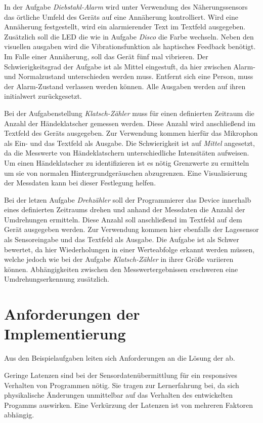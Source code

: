 \documentclass[11pt,a4paper]{report}
\begin{document}
In der Aufgabe \textit{Diebstahl-Alarm} wird unter Verwendung des Näherungssensors das örtliche Umfeld des Geräts auf eine Annäherung kontrolliert.
Wird eine Annäherung festgestellt, wird ein alarmierender Text im Textfeld ausgegeben.
Zusätzlich soll die LED die wie in Aufgabe \textit{Disco} die Farbe wechseln.
Neben den visuellen ausgaben wird die Vibrationsfunktion als haptisches Feedback benötigt.
Im Falle einer Annäherung, soll das Gerät fünf mal vibrieren.
Der Schwierigkeitsgrad der Aufgabe ist als Mittel eingestuft, da hier zwischen Alarm- und Normalzustand unterschieden werden muss.
Entfernt sich eine Person, muss der Alarm-Zustand verlassen werden können.
Alle Ausgaben werden auf ihren initialwert zurückgesetzt.

Bei der Aufgabenstellung \textit{Klatsch-Zähler} muss für einen definierten Zeitraum die Anzahl der Händeklatscher gemessen werden.
Diese Anzahl wird anschließend im Textfeld des Geräts ausgegeben.
Zur Verwendung kommen hierfür das Mikrophon als Ein- und das Textfeld als Ausgabe.
Die Schwierigkeit ist auf \textit{Mittel} angesetzt, da die Messwerte von Händeklatschern unterschiedliche Intensitäten aufweisen.
Um einen Händeklatscher zu identifizieren ist es nötig Grenzwerte zu ermitteln um sie von normalen Hintergrundgeräuschen abzugrenzen.
Eine Visualisierung der Messdaten kann bei dieser Festlegung helfen.

Bei der letzen Aufgabe \textit{Drehzähler} soll der Programmierer das Device innerhalb eines definierten Zeitraums drehen und anhand der Messdaten die Anzahl der Umdrehungen ermitteln.
Diese Anzahl soll anschließend im Textfeld auf dem Gerät ausgegeben werden.
Zur Verwendung kommen hier ebenfalls der Lagesensor als Sensoreingabe und das Textfeld als Ausgabe.
Die Aufgabe ist als Schwer bewertet, da hier Wiederholungen in einer Werteabfolge erkannt werden müssen, welche jedoch wie bei der Aufgabe \textit{Klatsch-Zähler} in ihrer Größe variieren können.
Abhängigkeiten zwischen den Messwertergebnissen erschweren eine Umdrehungserkennung zusätzlich.

\section{Anforderungen der Implementierung}\label{sec:anforderungen}
Aus den Beispielaufgaben leiten sich Anforderungen an die Lösung der ab.

Geringe Latenzen sind bei der Sensordatenübermittlung für ein responsives Verhalten von Programmen nötig.
Sie tragen zur Lernerfahrung bei, da sich physikalische Änderungen unmittelbar auf das Verhalten des entwickelten Progamms auswirken.
Eine Verkürzung der Latenzen ist von mehreren Faktoren abhängig.
\end{document}
